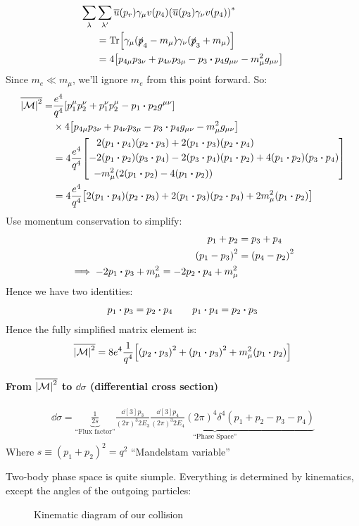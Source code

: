 \begin{align*}
  \sum_\lambda&\sum_{\lambda'}\bar{u}(p_r)\gamma_\mu v(p_4){\qty(\bar{u}(p_3)\gamma_\nu v(p_4))}^*\\
  &=\Tr[\gamma_\mu(\slap_4-m_\mu)\gamma_\nu(\slap_3+m_\mu)]\\
  &=4\qty[p_{4\mu}p_{3\nu}+p_{4\nu}p_{3\mu}-p_3\vdot p_4g_{\mu\nu}-m_\mu^2g_{\mu\nu}]
\end{align*}
Since $m_e\ll m_\mu$, we'll ignore $m_e$ from this point forward. So:
\begin{align*}
  \overline{\abs{\M}^2}=&\frac{e^4}{q^4}\qty[p_1^\mu p_2^\nu+p_1^\nu p_2^\mu-p_1\vdot p_2g^{\mu\nu}]\\
  &\times4\qty[p_{4\mu}p_{3\nu}+p_{4\nu}p_{3\mu}-p_3\vdot p_4g_{\mu\nu}-m_\mu^2g_{\mu\nu}]\\
  &=4\frac{e^4}{q^4}\qty[
  \begin{aligned}
    2&(p_1\vdot p_4)(p_2\vdot p_3)+2(p_1\vdot p_3)(p_2\vdot p_4)\\
    -2&(p_1\vdot p_2)(p_3\vdot p_4)-2(p_3\vdot p_4)(p_1\vdot p_2)+4(p_1\vdot p_2)(p_3\vdot p_4)\\
    -&m_\mu^2(2(p_1\vdot p_2)-4(p_1\vdot p_2))
  \end{aligned}
  ]\\
  &=4\frac{e^4}{q^4}\qty[2(p_1\vdot p_4)(p_2\vdot p_3)+2(p_1\vdot p_3)(p_2\vdot p_4)+2m_\mu^2(p_1\vdot p_2)]
\end{align*}
Use momentum conservation to simplify:
\begin{align*}
  p_1+p_2&=p_3+p_4\\
  {(p_1-p_3)}^2&={(p_4-p_2)}^2\\
  \implies -2p_1\vdot p_3+m_\mu^2=-2p_2\vdot p_4+m_\mu^2
\end{align*}
Hence we have two identities:
\begin{align*}
  p_1\vdot p_3=p_2\vdot p_4\qquad p_1\vdot p_4=p_2\vdot p_3
\end{align*}
Hence the fully simplified matrix element is:
\begin{align*}
  \overline{\abs{\M}^2}=8e^4\frac1{q^4}\qty[{(p_2\vdot p_3)}^2+{(p_1\vdot p_3)}^2+m_\mu^2(p_1\vdot p_2)]
\end{align*}

\paragraph{From $\overline{\abs{\mathcal{M}}^2}$ to $\dd{\sigma}$ (differential cross section)}
\begin{align*}
  \dd{\sigma}=\underbrace{\frac1{2s}}_{\text{``Flux factor''}}
  \underbrace{\frac{\dd[3]{p_3}}{{(2\pi)}^3 2E_3}\frac{\dd[3]{p_4}}{{(2\pi)}^3 2E_4}{(2\pi)}^4\delta^4(p_1+p_2-p_3-p_4)}_{\text{``Phase Space''}}
\end{align*}
Where $s\equiv{(p_1+p_2)}^2=q^2$ ``Mandelstam variable''

Two-body phase space is quite siumple. Everything is determined by kinematics, except the angles of the outgoing particles:
\begin{figure}[H]
  \centering
  
  \caption{Kinematic diagram of our collision}\label{fig:kinematics}
\end{figure}

